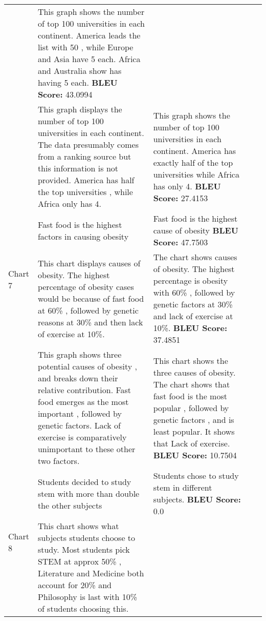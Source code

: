 \documentclass[]{article}
\begin{document}
\begin{landscape}
\begin{longtable}{|p{13mm}|p{57mm}|p{57mm}|p{57mm}|p{57mm}|}
 & This graph shows the number of top 100 universities in each continent. America leads the list with 50 , while Europe and Asia have 5 each. Africa and Australia show has having 5 each.
\newline \textbf{BLEU Score: }43.0994\\ \cline{2-5}&This graph displays the number of top 100 universities in each continent. The data presumably comes from a ranking source but this information is not provided. America has half the top universities , while Africa only has 4. 
 & This graph shows the number of top 100 universities in each continent. America has exactly half of the top universities while Africa has only 4.
\newline \textbf{BLEU Score: }27.4153\\ \cline{2-5}\hline\multirow{2}{*}{Chart 7}&Fast food is the highest factors in causing obesity 
 & Fast food is the highest cause of obesity
\newline \textbf{BLEU Score: }47.7503\\ \cline{2-5}&This chart displays causes of obesity. The highest percentage of obesity cases would be because of fast food at 60\% , followed by genetic reasons at 30\% and then lack of exercise at 10\%. 
 & The chart shows causes of obesity. The highest percentage is obesity with 60\% , followed by genetic factors at 30\% and lack of exercise at 10\%.
\newline \textbf{BLEU Score: }37.4851\\ \cline{2-5}&This graph shows three potential causes of obesity , and breaks down their relative contribution. Fast food emerges as the most important , followed by genetic factors. Lack of exercise is comparatively unimportant to these other two factors. 
 & This chart shows the three causes of obesity. The chart shows that fast food is the most popular , followed by genetic factors , and is least popular. It shows that Lack of exercise.
\newline \textbf{BLEU Score: }10.7504\\ \cline{2-5}\hline\multirow{2}{*}{Chart 8}&Students decided to study stem with more than double the other subjects 
 & Students chose to study stem in different subjects.
\newline \textbf{BLEU Score: }0.0\\ \cline{2-5}&This chart shows what subjects students choose to study. Most students pick STEM at approx 50\% , Literature and Medicine both account for 20\% and Philosophy is last with 10\% of students choosing this. 

\end{longtable}
\end{landscape}
\end{document}
